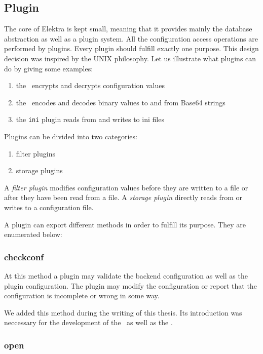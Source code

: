 \subsection{Plugin}\label{impl_elektra_plugin}

The core of Elektra is kept small, meaning that it provides mainly the database abstraction as well as a plugin system.
All the configuration access operations are performed by plugins.\cite{raab2010thesis}
Every plugin should fulfill exactly one purpose.
This design decision was inspired by the UNIX philosophy.
Let us illustrate what plugins can do by giving some examples:
\begin{enumerate}
\item the \crypto ~encrypts and decrypts configuration values
\item the \base ~encodes and decodes binary values to and from Base64 strings
\item the \texttt{ini} plugin reads from and writes to ini files
\end{enumerate}

Plugins can be divided into two categories:
\begin{enumerate}
\item filter plugins
\item storage plugins
\end{enumerate}

A \emph{filter plugin} modifies configuration values before they are written to a file or after they have been read from a file.
A \emph{storage plugin} directly reads from or writes to a configuration file.

A plugin can export different methods in order to fulfill its purpose.
They are enumerated below:

\subsubsection{checkconf}\label{impl-method-checkconf}

At this method a plugin may validate the backend configuration as well as
the plugin configuration. The plugin may modify the configuration or
report that the configuration is incomplete or wrong in some way.

We added this method during the writing of this thesis.
Its introduction was neccessary for the development of the \crypto ~as well as the \fcrypt.

\subsubsection{open}\label{open}

